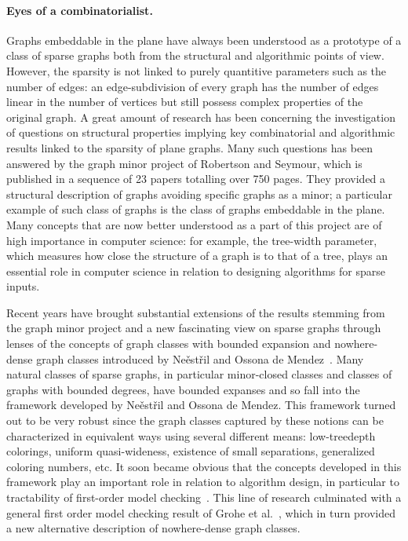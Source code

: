 \paragraph*{Eyes of a combinatorialist.}

Graphs embeddable in the plane have always been understood as a prototype of a class of sparse graphs
both from the structural and algorithmic points of view.
However, the sparsity is not linked to purely quantitive parameters such as the number of edges:
an edge-subdivision of every graph has the number of edges linear in the number of vertices
but still possess complex properties of the original graph.
A great amount of research has been concerning the investigation of questions on structural properties
implying key combinatorial and algorithmic results linked to the sparsity of plane graphs.
Many such questions has been answered by the graph minor project of Robertson and Seymour,
which is published in a sequence of 23 papers totalling over 750 pages.
They provided a structural description of graphs avoiding specific graphs as a minor;
a particular example of such class of graphs is the class of graphs embeddable in the plane.
Many concepts that are now better understood as a part of this project are of high importance in computer science:
for example, the tree-width parameter, which measures how close the structure of a graph is to that of a tree,
plays an essential role in computer science in relation to designing algorithms for sparse inputs.

Recent years have brought substantial extensions of the results stemming from the graph minor project and
a new fascinating view on sparse graphs through lenses of the concepts of graph classes with bounded expansion and
nowhere-dense graph classes introduced by Ne\v est\v ril and Ossona de Mendez~\cite{NesetrilM08,NesetrilM08a,NesetrilM08b}.
Many natural classes of sparse graphs, in particular minor-closed classes and classes of graphs with bounded degrees,
have bounded expanses and so fall into the framework developed by Ne\v est\v ril and Ossona de Mendez.
This framework turned out to be very robust since the graph classes captured by these notions
can be characterized in equivalent ways using several different means: low-treedepth colorings,
uniform quasi-wideness, existence of small separations, generalized coloring numbers, etc.
It soon became obvious that the concepts developed in this framework play an important role
in relation to algorithm design, in particular to tractability of first-order model checking~\cite{KreutzerD09,DvorakKT13,GroheK11}.
This line of research culminated with a general first order model checking result of Grohe et al.~\cite{grohe2017deciding},
which in turn provided a new alternative description of nowhere-dense graph classes.

